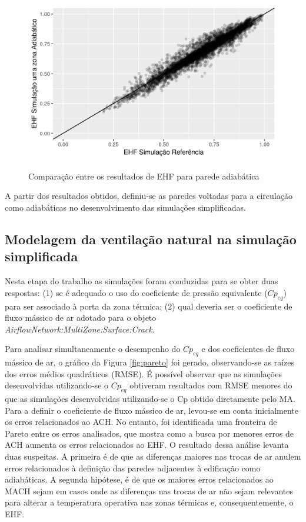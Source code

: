 \documentclass[brazil,hardcopy,openany,a4paper]{ufscthesis}
\begin{document}
		\begin{figure}[H]
			\centering
			\caption{Comparação entre os resultados de EHF para parede adiabática}
			\includegraphics[width=1\linewidth]{img/szadi_EHF_scatter.png}
			\label{fig:szadi_EHF}
		\end{figure}
		
		A partir dos resultados obtidos, definiu-se as paredes voltadas para a circulação como adiabáticas no desenvolvimento das simulações simplificadas.
		
	\subsection{Modelagem da ventilação natural na simulação simplificada}
	
	Nesta etapa do trabalho as simulações foram conduzidas para se obter duas respostas:
	(1) se é adequado o uso do coeficiente de pressão equivalente ($Cp_{eq}$) para ser associado à porta da zona térmica; (2) qual deveria ser o coeficiente de fluxo mássico de ar adotado para o objeto \textit{AirflowNetwork:MultiZone:Surface:Crack}.
	
	Para analisar simultaneamente o desempenho do $Cp_{eq}$ e dos coeficientes de fluxo mássico de ar, o gráfico da Figura \ref{fig:pareto} foi gerado, observando-se as raízes dos erros médios quadráticos (RMSE).
	É possível observar que as simulações desenvolvidas utilizando-se o $Cp_{eq}$ obtiveram resultados com RMSE menores do que as simulações desenvolvidas utilizando-se o Cp obtido diretamente pelo MA.
	Para a definir o coeficiente de fluxo mássico de ar, levou-se em conta inicialmente os erros relacionados ao ACH.
	No entanto, foi identificada uma fronteira de Pareto entre os erros analisados, que mostra como a busca por menores erros de ACH aumenta os erros relacionados ao EHF.
	O resultado dessa análise levanta duas suspeitas. A primeira é de que as diferenças maiores nas trocas de ar anulem erros relacionados à definição das paredes adjacentes à edificação como adiabáticas. A segunda hipótese, é de que os maiores erros relacionados ao MACH sejam em casos onde as diferenças nas trocas de ar não sejam relevantes para alterar a temperatura operativa nas zonas térmicas e, consequentemente, o EHF.
	
\end{document}

